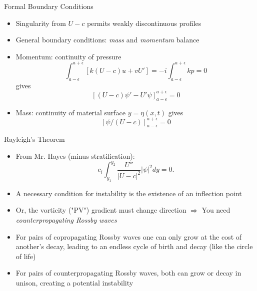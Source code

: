 \documentclass[landscape]{seminar}
\begin{document}
\begin{slide}

\begin{center}Formal Boundary Conditions\end{center}

\begin{itemize}
  \item Singularity from $U - c$ permits weakly discontinuous profiles

  \item General boundary conditions: \emph{mass} and \emph{momentum} balance

  \item Momentum: continuity of pressure
\begin{equation*}
\int_{a-\epsilon}^{a+\epsilon} \left[k (U - c) u + v U' \right] = - i \int_{a-\epsilon}^{a+\epsilon} k p = 0
\end{equation*}
gives
\begin{equation}
\left[\left(U-c\right)\psi' - U' \psi \right]_{a-\epsilon}^{a+\epsilon} = 0
\end{equation}

  \item Mass: continuity of material surface $y = \eta(x, t)$ gives
\begin{equation}
\left[\psi / (U - c) \right]_{a-\epsilon}^{a+\epsilon} = 0
\end{equation}


\end{itemize}

\end{slide}
\begin{slide}

\begin{center}Rayleigh's Theorem\end{center}

\begin{itemize}
  \item From Mr. Hayes (minus stratification):
\begin{equation}
c_i \int_{y_1}^{y_2} \frac{U''}{|U-c|^2} |\psi|^2 dy = 0.
\end{equation}

  \item A necessary condition for instability is the existence of an inflection point

  \item Or, the vorticity ("PV") gradient must change direction $\Rightarrow$ You need \emph{counterpropagating Rossby waves}

  \item For pairs of copropagating Rossby waves one can only grow at the cost of another's decay, leading to an endless cycle of birth and decay (like the circle of life)

  \item For pairs of counterpropagating Rossby waves, both can grow or decay in unison, creating a potential instability

\end{itemize}

\end{slide}
\end{document}
